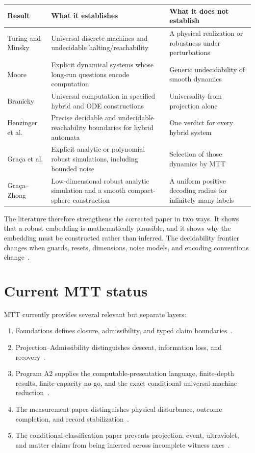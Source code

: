 \documentclass[11pt]{article}
\theoremstyle{definition}
\theoremstyle{remark}
\begin{document}
\begin{center}
\begin{tabularx}{0.96\textwidth}{@{}p{}YY@{}}
\toprule
Result & What it establishes & What it does not establish \\
\midrule
Turing and Minsky
& Universal discrete machines and undecidable halting/reachability
& A physical realization or robustness under perturbations
\\
Moore
& Explicit dynamical systems whose long-run questions encode computation
& Generic undecidability of smooth dynamics
\\
Branicky
& Universal computation in specified hybrid and ODE constructions
& Universality from projection alone
\\
Henzinger et al.
& Precise decidable and undecidable reachability boundaries for hybrid automata
& One verdict for every hybrid system
\\
Gra\c{c}a et al.
& Explicit analytic or polynomial robust simulations, including bounded noise
& Selection of those dynamics by MTT
\\
Gra\c{c}a--Zhong
& Low-dimensional robust analytic simulation and a smooth compact-sphere
construction
& A uniform positive decoding radius for infinitely many labels
\\
\bottomrule
\end{tabularx}
\end{center}

The literature therefore strengthens the corrected paper in two ways.  It
shows that a robust embedding is mathematically plausible, and it shows why
the embedding must be constructed rather than inferred.  The decidability
frontier changes when guards, resets, dimensions, noise models, and encoding
conventions change~\cite{HenzingerEtAl1995}.

\section{Current MTT status}

MTT currently provides several relevant but separate layers:
\begin{enumerate}[label=(\arabic*)]
\item Foundations defines closure, admissibility, and typed claim
boundaries~\cite{NeroFoundation}.
\item Projection--Admissibility distinguishes descent, information loss, and
recovery~\cite{NeroProjection}.
\item Program A2 supplies the computable-presentation language, finite-depth
results, finite-capacity no-go, and the exact conditional universal-machine
reduction~\cite{NeroA2}.
\item The measurement paper distinguishes physical disturbance, outcome
completion, and record stabilization~\cite{NeroMeasurement}.
\item The conditional-classification paper prevents projection, event,
ultraviolet, and matter claims from being inferred across incomplete witness
axes~\cite{NeroClassification}.
\end{enumerate}
\end{document}
